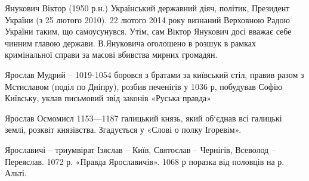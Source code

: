 Янукович Віктор (1950 р.н.) Український державний діяч, політик, Президент України (з 25 лютого 2010). 22 лютого 2014 року визнаний Верховною Радою України таким, що самоусунувся. Утім, сам Віктор Янукович досі вважає себе чинним главою держави. В.Януковича оголошено в розшук в рамках кримінальної справи за масові вбивства мирних громадян.

Ярослав Мудрий – 1019-1054 боровся з братами за київський стіл, правив разом з Мстиславом (поділ по Дніпру), розбив печенігів у 1036 р, побудував Софію Київську, уклав письмовий звід законів «Руська правда»

Ярослав Осмомисл 1153—1187 галицький князь, який об‘єднав всі галицькі землі, розквіт князівства. Згадується у «Слові о полку Ігоревім».

Ярославичі – триумвірат Ізяслав – Київ, Святослав – Чернігів, Всеволод – Переяслав. 1072 р. «Правда Ярославичів». 1068 р поразка від половців на р. Альті.


